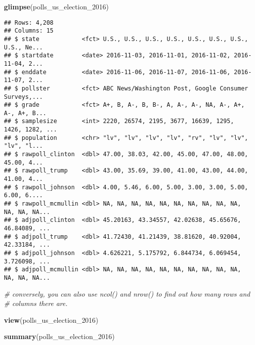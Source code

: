 \documentclass[
]{article}
\newenvironment{Shaded}{\begin{snugshade}}{\end{snugshade}}
\newcommand{\CommentTok}[1]{\textcolor[rgb]{0.56,0.35,0.01}{\textit{#1}}}
\newcommand{\DecValTok}[1]{\textcolor[rgb]{0.00,0.00,0.81}{#1}}
\newcommand{\KeywordTok}[1]{\textcolor[rgb]{0.13,0.29,0.53}{\textbf{#1}}}
\newcommand{\NormalTok}[1]{#1}
\begin{document}
\begin{Shaded}
\begin{Highlighting}[]
\KeywordTok{glimpse}\NormalTok{(polls_us_election_}\DecValTok{2016}\NormalTok{)}
\end{Highlighting}
\end{Shaded}

\begin{verbatim}
## Rows: 4,208
## Columns: 15
## $ state            <fct> U.S., U.S., U.S., U.S., U.S., U.S., U.S., U.S., Ne...
## $ startdate        <date> 2016-11-03, 2016-11-01, 2016-11-02, 2016-11-04, 2...
## $ enddate          <date> 2016-11-06, 2016-11-07, 2016-11-06, 2016-11-07, 2...
## $ pollster         <fct> ABC News/Washington Post, Google Consumer Surveys,...
## $ grade            <fct> A+, B, A-, B, B-, A, A-, A-, NA, A-, A+, A-, A+, B...
## $ samplesize       <int> 2220, 26574, 2195, 3677, 16639, 1295, 1426, 1282, ...
## $ population       <chr> "lv", "lv", "lv", "lv", "rv", "lv", "lv", "lv", "l...
## $ rawpoll_clinton  <dbl> 47.00, 38.03, 42.00, 45.00, 47.00, 48.00, 45.00, 4...
## $ rawpoll_trump    <dbl> 43.00, 35.69, 39.00, 41.00, 43.00, 44.00, 41.00, 4...
## $ rawpoll_johnson  <dbl> 4.00, 5.46, 6.00, 5.00, 3.00, 3.00, 5.00, 6.00, 6....
## $ rawpoll_mcmullin <dbl> NA, NA, NA, NA, NA, NA, NA, NA, NA, NA, NA, NA, NA...
## $ adjpoll_clinton  <dbl> 45.20163, 43.34557, 42.02638, 45.65676, 46.84089, ...
## $ adjpoll_trump    <dbl> 41.72430, 41.21439, 38.81620, 40.92004, 42.33184, ...
## $ adjpoll_johnson  <dbl> 4.626221, 5.175792, 6.844734, 6.069454, 3.726098, ...
## $ adjpoll_mcmullin <dbl> NA, NA, NA, NA, NA, NA, NA, NA, NA, NA, NA, NA, NA...
\end{verbatim}

\begin{Shaded}
\begin{Highlighting}[]
\CommentTok{# conversely, you can also use ncol() and nrow() to find out how many rows and }
\CommentTok{# columns there are.}

\KeywordTok{view}\NormalTok{(polls_us_election_}\DecValTok{2016}\NormalTok{)}

\KeywordTok{summary}\NormalTok{(polls_us_election_}\DecValTok{2016}\NormalTok{)}
\end{Highlighting}
\end{Shaded}
\end{document}
